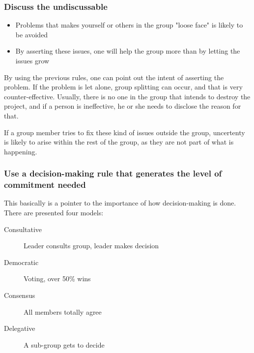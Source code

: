 \documentclass[screen]{beamer}
\begin{document}
\begin{frame}
    \frametitle{Discuss the undiscussable}

\begin{itemize}
    \item Problems that makes yourself or others in the group "loose face" is likely to be avoided
    \item By asserting these issues, one will help the group more than by letting the issues grow
\end{itemize}

    By using the previous rules, one can point out the intent of asserting the problem. If the problem is let alone,
group splitting can occur, and that is very counter-effective. Usually, there is no one in the group that intends to
destroy the project, and if a person is ineffective, he or she needs to disclose the reason for that.

If a group member tries to fix these kind of issues outside the group, uncertenty is likely to arise within the
rest of the group, as they are not part of what is happening.

\end{frame}

\begin{frame}
    \frametitle{Use a decision-making rule that generates the level of commitment needed}

This basically is a pointer to the importance of how decision-making is done. There are presented four models:
\begin{description}
    \item[Consultative] Leader consults group, leader makes decision
    \item[Democratic] Voting, over 50\% wins
    \item[Consensus] All members totally agree
    \item[Delegative] A sub-group gets to decide
\end{description}

\end{frame}
\end{document}
